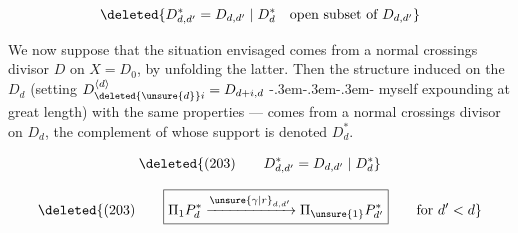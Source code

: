 \[
\deleted{D_{d,d'}^*=D_{d,d'}\mid D_d^*\quad\text{open subset of }D_{d,d'}}
\]

We now suppose that the situation envisaged comes from a normal crossings divisor $D$ on $X=D_0$, by unfolding the latter. Then  the structure   induced on the $D_d$ (setting $D_{\deleted{\unsure{d}}i}^{\langle d\rangle}=D_{d+i,d}$ \mbox{-\kern.3em-\kern.3em-\kern.3em-}   myself expounding at great length) with the same properties ---  comes from a normal crossings divisor  on $D_d$, the complement of whose support is denoted $D_d^*$.

\[
\deleted{(203)\qquad D_{d,d'}^*=D_{d,d'}\mid D_d^*}
\]

\[
\deleted{(203)\qquad\boxed{\Pi_1P_d^*\xrightarrow{\unsure{\gamma|r}_{d,d'}}\Pi_{\unsure{1}}P_{d'}^*}\qquad\text{for }d'<d}
\]
